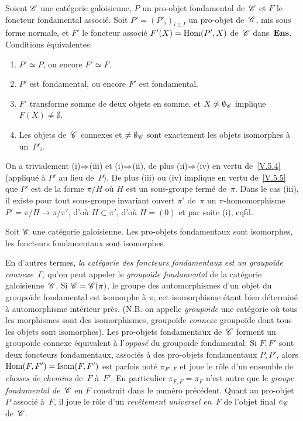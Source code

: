 \begin{proposition}
\label{V.5.6}
Soient $\cal{C}$ une cat\'egorie galoisienne, $P$ un pro-objet
fondamental de~$\cal{C}$ et $F$ le foncteur fondamental
associ\'e. Soit $P'=(P'_i)_{i\in I}$ un pro-objet de~$\cal{C}$, mis
sous forme normale, et $F'$ le foncteur associ\'e $F'(X)=\operatorname{Hom}(P',X)$
de~$\cal{C}$ dans~$\mathbf{Ens}$. Conditions \'equivalentes:
\begin{enumerate}
\item[(i)] $P'\simeq P$, ou encore $F'\simeq F$.
\item[(ii)] $P'$ est fondamental, ou encore $F'$ est
fondamental.
\item[(iii)] $F'$ transforme somme de deux objets en somme, et
$X\not\simeq\emptyset_{\cal{C}}$ implique $F(X)\ne\emptyset$.
\item[(iv)]
Les objets de~$\cal{C}$ connexes et $\ne\emptyset_{\cal{C}}$ sont
exactement les objets isomorphes \`a un~$P'_i$.
\end{enumerate}
\end{proposition}

On a trivialement (i)$\To$(iii) et (i)$\To$(ii),
de plus (ii)$\To$(iv) en vertu de~\ref{V.5.4} (appliqu\'e
\`a $P'$ au lieu de~$P$). De plus (iii) ou (iv) implique en vertu
de~\ref{V.5.5} que $P'$ est de la forme $\pi/H$ o\`u $H$ est un
sous-groupe ferm\'e de~$\pi$. Dans le cas (iii), il existe pour tout
sous-groupe invariant ouvert $\pi'$ de~$\pi$ un $\pi$-homomorphisme
$P'=\pi/H\to \pi/\pi'$, d'o\`u $H\subset \pi'$, d'o\`u $H=(0)$ et
par suite (i), cqfd.

\begin{corollaire}
\label{V.5.7}
Soit $\cal{C}$ une cat\'egorie galoisienne. Les pro-objets
fondamentaux sont isomorphes, les foncteurs fondamentaux sont
isomorphes.
\end{corollaire}

En d'autres termes, \emph{la catégorie des foncteurs fondamentaux
est un groupoïde connexe~$\Gamma$},
\label{indnot:ef}qu'on peut appeler le \emph{groupoïde fondamental}
de la cat\'egorie galoisienne~$\cal{C}$. Si $\cal{C}=\cal{C}(\pi)$,
le groupe des automorphismes d'un objet du groupo\"ide fondamental
est isomorphe \`a $\pi$, cet isomorphisme \'etant bien
d\'etermin\'e \`a automorphisme int\'erieur pr\`es. (N.B. on
appelle \emph{groupoïde} une cat\'egorie o\`u tous les
morphismes sont des isomorphismes, groupo\"ide \emph{connexe}
groupo\"ide dont tous les objets sont isomorphes). Les pro-objets
fondamentaux de~$\cal{C}$ forment un groupo\"ide connexe
\'equivalent \`a l'\emph{opposé} du groupo\"ide
fondamental. Si $F, F'$ sont deux foncteurs fondamentaux, associ\'es
\`a des pro-objets fondamentaux $P, P'$, alors $\operatorname{Hom}(F, F')=\operatorname{Isom}(F,
F')$ est parfois not\'e $\pi_{F', F}$ et joue le r\^ole d'un
\og ensemble de \emph{classes de chemins} de~$F$ \`a~$F'$\fg. En
particulier $\pi_{F, F}=\pi_F$ n'est autre que le \emph{groupe
fondamental de~$\cal{C}$} en $F$ construit dans le num\'ero
pr\'ec\'edent. Quant au pro-objet $P$ associ\'e \`a~$F$, il
joue le r\^ole d'un \emph{revêtement universel en~$F$} de
l'objet final $e_{\cal{C}}$ de~$\cal{C}$.

